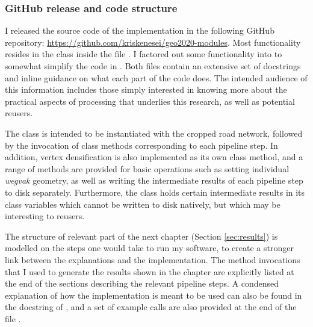 \subsubsection{GitHub release and code structure}

I released the source code of the implementation in the following GitHub repository:
\url{https://github.com/kriskenesei/geo2020-modules}. Most functionality resides in the class  inside the file . I factored out some functionality into  to somewhat simplify the code in . Both files contain an extensive set of docstrings and inline guidance on what each part of the code does. The intended audience of this information includes those simply interested in knowing more about the practical aspects of processing that underlies this research, as well as potential reusers.

The class  is intended to be instantiated with the cropped road network, followed by the invocation of class methods corresponding to each pipeline step. In addition, vertex densification is also implemented as its own class method, and a range of methods are provided for basic operations such as setting individual \textit{wegvak} geometry, as well as writing the intermediate results of each pipeline step to disk separately. Furthermore, the class holds certain intermediate results in its class variables which cannot be written to disk natively, but which may be interesting to reusers.

The structure of relevant part of the next chapter (Section \ref{sec:results}) is modelled on the steps one would take to run my software, to create a stronger link between the explanations and the implementation. The method invocations that I used to generate the results shown in the chapter are explicitly listed at the end of the sections describing the relevant pipeline steps. A condensed explanation of how the implementation is meant to be used can also be found in the docstring of , and a set of example calls are also provided at the end of the file .